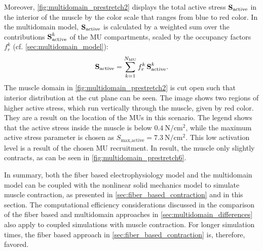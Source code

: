 Moreover, \cref{fig:multidomain_prestretch2} displays the total active stress  $\textbf{S}_\text{active}$ in the interior of the muscle by the color scale that ranges from blue to red color. In the multidomain model, $\textbf{S}_\text{active}$ is calculated by a weighted sum over the contributions $\textbf{S}_\text{active}^k$ of the MU compartments, scaled by the occupancy factors $f_r^k$ (cf. \cref{sec:multidomain_model}):
\begin{align*}
  \textbf{S}_\text{active} = \sum\limits_{k=1}^{N_\text{MU}} f_r^k\,\textbf{S}_\text{active}^k.
\end{align*}
The muscle domain in \cref{fig:multidomain_prestretch2} is cut open such that interior distribution at the cut plane can be seen. The image shows two regions of higher active stress, which run vertically through the muscle, given by red color. They are a result on the location of the MUs in this scenario. The legend shows that the active stress inside the muscle is below $\SI{0.4}{\newton\per\centi\meter\squared}$, while the maximum active stress parameter is chosen as $S_\text{max,active}=\SI{7.3}{\newton\per\centi\meter\squared}$. This low activation level is a result of the chosen MU recruitment. In result, the muscle only slightly contracts, as can be seen in \cref{fig:multidomain_prestretch6}.

In summary, both the fiber based electrophysiology model and the multidomain model can be coupled with the nonlinear solid mechanics model to simulate muscle contraction, as presented in \cref{sec:fiber_based_contraction} and in this section. 
The computational efficiency considerations discussed in the comparison of the fiber based and multidomain approaches in \cref{sec:multidomain_differences} also apply to coupled simulations with muscle contraction. For longer simulation times, the fiber based approach in \cref{sec:fiber_based_contraction} is, therefore, favored.

